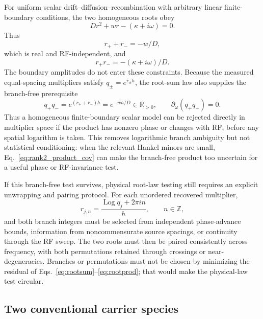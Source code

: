 \documentclass[11pt]{article}
\begin{document}
For uniform scalar drift--diffusion--recombination with arbitrary linear finite-boundary conditions, the two homogeneous roots obey
\begin{equation}
D r^2+w r-(\kappa+i\omega)=0.
\end{equation}
Thus
\begin{equation}
\boxed{r_++r_-=-w/D,}
\label{eq:rootsum}
\end{equation}
which is real and RF-independent, and
\begin{equation}
\boxed{r_+r_-=-(\kappa+i\omega)/D.}
\label{eq:rootprod}
\end{equation}
The boundary amplitudes do not enter these constraints. Because the measured equal-spacing multipliers satisfy $q_\pm=e^{r_\pm h}$, the root-sum law also supplies the branch-free prerequisite
\begin{equation}
\boxed{q_+q_-=e^{(r_++r_-)h}=e^{-wh/D}\in\mathbb{R}_{>0},\qquad \partial_\omega(q_+q_-)=0.}
\label{eq:multiplier_product_boundary}
\end{equation}
Thus a homogeneous finite-boundary scalar model can be rejected directly in multiplier space if the product has nonzero phase or changes with RF, before any spatial logarithm is taken. This removes logarithmic branch ambiguity but not statistical conditioning: when the relevant Hankel minors are small, Eq.~\eqref{eq:rank2_product_cov} can make the branch-free product too uncertain for a useful phase or RF-invariance test.

If this branch-free test survives, physical root-law testing still requires an explicit unwrapping and pairing protocol. For each unordered recovered multiplier,
\begin{equation}
r_{j,n}=\frac{\operatorname{Log}q_j+2\pi i n}{h},\qquad n\in\mathbb Z,
\end{equation}
and both branch integers must be selected from independent phase-advance bounds, information from noncommensurate source spacings, or continuity through the RF sweep. The two roots must then be paired consistently across frequency, with both permutations retained through crossings or near-degeneracies. Branches or permutations must not be chosen by minimizing the residual of Eqs.~\eqref{eq:rootsum}--\eqref{eq:rootprod}; that would make the physical-law test circular.

\subsection{Two conventional carrier species}
\end{document}
